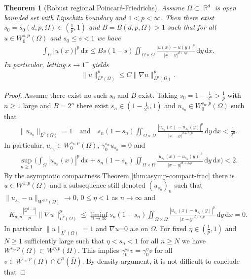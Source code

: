 \documentclass[12pt, reqno]{amsart}%
\theoremstyle{plain}  %
\newtheorem{theorem}{Theorem}[section]
\theoremstyle{definition}  %
\theoremstyle{remark}
\numberwithin{equation}{section}
\DeclareMathOperator{\R}{\mathbb{R}}
\renewcommand{\d}{\,\mathrm{d}}
\begin{document}
\begin{theorem}[Robust regional Poincar\'e-Friedrichs]
\label{thm:robust-poinca-fried-regio}
Assume  $\Omega\subset \R^d$ is open  bounded set with Lipschitz boundary and $1< p <\infty$. Then there exist $s_0= s_0(d,p,\Omega)\in (\frac{1}{p},1 )$  and $B=B(d,p,\Omega)>1$ such that for all $u\in W^{s,p}_0(\Omega)$  and $s_0 \leq s <1$  we have
\begin{align*}
\int_\Omega |u(x)|^p\d x\leq Bs(1-s) \iint_{ \Omega \times \Omega}\frac{|u(x)-u(y)|^p}{|x-y|^{d+sp}}\d y \d x.
\end{align*}
In particular, letting  $s\to 1^-$ yields
\begin{align*}
\|u\|^p_{L^p(\Omega)}\leq C\|\nabla u\|^p_{L^p(\Omega)}.
\end{align*}
\end{theorem}
\begin{proof}
Assume there exist no such $s_0$ and $B$ exist. Taking $s_0 = 1-\frac{1}{2^n}>\frac{1}{p}$ with $n \geq 1$ large and $B = 2^n$ there exist $s_n \in (1-\frac{1}{2^n},1)$ and $u_{s_n} \in W^{s_n, p}_0(\Omega)$ such that
\begin{align*}
\|u_{s_n}\|_{L^p(\Omega)} = 1\quad \text{and}\quad s_n(1-s_n)\iint_{ \Omega \times \Omega}\frac{|u_{s_n}(x)-u_{s_n}(y)|^p}{|x-y|^{d+s_sp}}\d y \d x<\frac{1}{2^n}.
\end{align*}
In particular, $u_{s_n}\in W^{s_n, p}_0(\Omega)$, $\gamma^{s_n}_0 u_{s_n}=0$ and
\begin{align*}
\sup_{n\geq 1}\Big( \int_\Omega |u_{s_n}(x)|^p\d x+ s_n(1-s_n)\iint_{ \Omega \times \Omega}\frac{|u_{s_n}(x)-u_{s_n}(y)|^p}{|x-y|^{d+s_sp}}\d y \d x\Big)<2.
\end{align*}
By the asymptotic compactness Theorem \ref{thm:asymp-compact-frac} there is $u \in W^{1,p}(\Omega)$ and a subsequence still denoted $(u_{s_n})_n$  such that $\|u_{s_n}-u\|_{W^{\eta,p}(\Omega)}\to0$, $0\leq \eta<1$ as $n\to \infty$ and
\begin{align*}
K_{d,p} \frac{|\mathbb{S}^{d-1}|}{p}\|\nabla u\|_{L^p(\Omega)}^p \leq \liminf_{n\to\infty} s_n(1-s_n)\iint_{ \Omega \times \Omega}\frac{|u_{s_n}(x)-u_{s_n}(y)|^p}{|x-y|^{d+s_sp}}\d y \d x= 0.
\end{align*}
In particular $\|u\|_{L^p(\Omega)}=1$ and $\nabla u$=0 a.e on $\Omega$.  For fixed $\eta\in (\frac{1}{p}, 1)$ and  $N\geq 1$ sufficiently large such that $\eta<s_n<1$ for all $n\geq N$ we have $W^{s_n,p}(\Omega)\subset W^{\eta,p}(\Omega)$. This implies $\gamma^{s_n}_0 v= \gamma^\eta_0v $ for all $v\in W^{s_n,p}(\Omega)\cap C^1(\overline{\Omega})$. By density argument, it is not difficult to conclude that

\end{proof}
\end{document}
